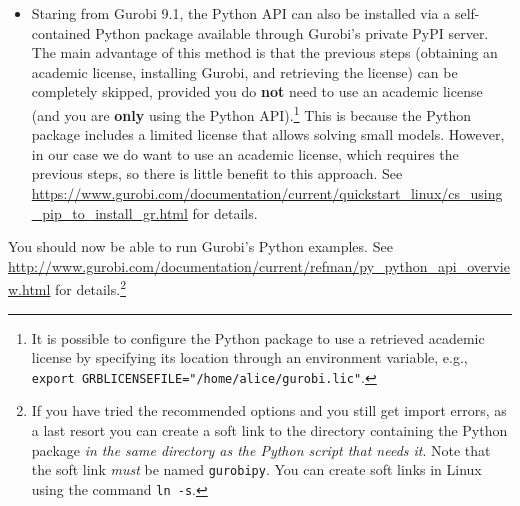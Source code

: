 \documentclass[12pt]{article}
\begin{document}
\begin{itemize}
    \item Staring from Gurobi 9.1, the Python API can also be installed via a self-contained Python package available through Gurobi's private PyPI server.
        The main advantage of this method is that the previous steps (obtaining an academic license, installing Gurobi, and retrieving the license) can be completely skipped, provided you do \textbf{not} need to use an academic license (and you are \textbf{only} using the Python API).\footnote{
            It is possible to configure the Python package to use a retrieved academic license by specifying its location through an environment variable, e.g., \texttt{export GRB\ttul LICENSE\ttul FILE="/home/alice/gurobi.lic"}.
        }
        This is because the Python package includes a limited license that allows solving small models.
        However, in our case we do want to use an academic license, which requires the previous steps, so there is little benefit to this approach.
        See \url{https://www.gurobi.com/documentation/current/quickstart_linux/cs_using_pip_to_install_gr.html} for details.
\end{itemize}
You should now be able to run Gurobi's Python examples.
See \url{http://www.gurobi.com/documentation/current/refman/py_python_api_overview.html} for details.\footnote{
    If you have tried the recommended options and you still get import errors, as a last resort you can create a soft link to the directory containing the Python package \emph{in the same directory as the Python script that needs it}.
    Note that the soft link \emph{must} be named \texttt{gurobipy}.
    You can create soft links in Linux using the command \texttt{ln -s}.
}
\end{document}
